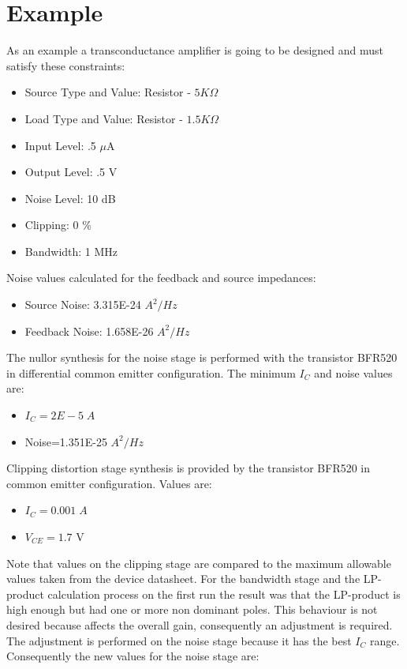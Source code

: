 \documentclass[twocolumn]{IEEEtran}
\begin{document}
\section{Example}
As an example a transconductance amplifier is going to be designed and must satisfy these constraints:

\begin{itemize}
\item Source Type and Value: Resistor - $5K{\Omega}$
\item Load Type and Value: Resistor - $1.5K{\Omega}$
\item Input Level: .5 $\mu$A
\item Output Level: .5 V
\item Noise Level: 10 dB
\item Clipping: 0 \%
\item Bandwidth: 1 MHz
\end{itemize}

Noise values calculated for the feedback and source impedances:

\begin{itemize}
\item Source Noise: 3.315E-24 $A^2/Hz$
\item Feedback Noise: 1.658E-26 $A^2/Hz$
\end{itemize}

The nullor synthesis for the noise stage is performed with the transistor BFR520 \cite{bfr520} in differential common emitter configuration. The minimum $I_C$ and noise values are: 

\begin{itemize}
\item $I_C=2E-5\;A$
\item Noise=1.351E-25 $A^2/Hz$
\end{itemize}

Clipping distortion stage synthesis is provided by the transistor BFR520 in common emitter configuration. Values are:

\begin{itemize}
\item $I_C=0.001\;A$
\item $V_{CE}=1.7$ V
\end{itemize}

Note that values on the clipping stage are compared to the maximum allowable values taken from the device datasheet. For the bandwidth stage and the LP-product calculation process on the first run the result was that the LP-product is high enough but had one or more non dominant poles. This behaviour is not desired because affects the overall gain, consequently an adjustment is required. The adjustment is performed on the noise stage because it has the best $I_C$ range. Consequently the new values for the noise stage are:
\end{document}
